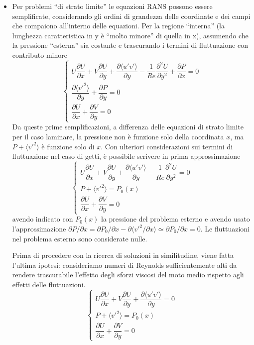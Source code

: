 \begin{itemize}
\item Per problemi ``di strato limite'' le equazioni RANS possono essere
 semplificate, considerando gli ordini di grandezza delle coordinate e 
 dei campi che compaiono all'interno delle equazioni.
 Per la regione ``interna'' (la lunghezza caratteristica in y è ``molto 
 minore'' di quella in x), assumendo che la pressione ``esterna'' sia
 costante e trascurando i termini di fluttuazione con contributo minore 
 \begin{equation}
 \begin{cases}
U \dfrac{\partial U}{\partial x} + V \dfrac{\partial U}{\partial y} 
+ \dfrac{\partial \langle u'v' \rangle}{\partial y}  
- \dfrac{1}{Re} \dfrac{\partial^2 U }{\partial y^2}
+\dfrac{\partial P}{\partial x} = 0 \\
 \dfrac{\partial \langle v'^2 \rangle}{\partial y}  
+\dfrac{\partial P}{\partial y} = 0 \\
\dfrac{\partial U}{\partial x} + \dfrac{\partial V}{\partial y} = 0 
 \end{cases}
 \end{equation}
 Da queste prime semplificazioni, a differenza delle equazioni di 
 strato limite per il caso laminare, la pressione non è funzione solo
 della coordinata $x$, ma $P+\langle v'^2 \rangle$ è funzione solo di
 $x$. Con ulteriori considerazioni sui termini di fluttuazione nel caso
 di getti, è possibile scrivere in prima approssimazione
 \begin{equation}
 \begin{cases}
U \dfrac{\partial U}{\partial x} + V \dfrac{\partial U}{\partial y} 
+ \dfrac{\partial \langle u'v' \rangle}{\partial y}  
- \dfrac{1}{Re} \dfrac{\partial^2 U }{\partial y^2} = 0 \\
P + \langle v'^2  \rangle = P_0(x) \\ 
\dfrac{\partial U}{\partial x} + \dfrac{\partial V}{\partial y} = 0 
 \end{cases}
 \end{equation}
 avendo indicato con $P_0(x)$ la pressione del problema esterno e avendo usato l'approssimazione $\partial P/\partial x = \partial P_0 / \partial x - \partial \langle v'^2 / \partial x \rangle \simeq \partial P_0 / \partial x = 0$. Le fluttuazioni
 nel problema esterno sono considerate nulle.

 Prima di procedere con la ricerca di soluzioni in similitudine, viene
 fatta l'ultima ipotesi: consideriamo numeri di Reynolds sufficientemente
 alti da rendere trascurabile l'effetto degli sforzi viscosi del moto
 medio rispetto agli effetti delle fluttuazioni.
 \begin{equation}
 \begin{cases}
U \dfrac{\partial U}{\partial x} + V \dfrac{\partial U}{\partial y} 
+ \dfrac{\partial \langle u'v' \rangle}{\partial y} = 0 \\ 
P + \langle v'^2  \rangle = P_0(x) \\ 
\dfrac{\partial U}{\partial x} + \dfrac{\partial V}{\partial y} = 0 
 \end{cases}
 \end{equation}



\end{itemize}
